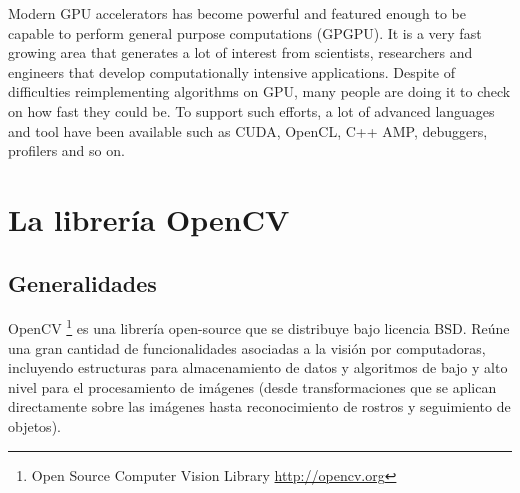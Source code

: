 \documentclass[a4paper,10pt]{report}
\begin{document}




Modern GPU accelerators has become powerful and featured enough to be capable to perform general purpose computations (GPGPU).  
It is a very fast growing area that generates a lot of interest from scientists, researchers and engineers that develop computationally intensive applications. 
Despite of difficulties reimplementing algorithms on GPU, many people are doing it to check on how fast they could be. 
To support such efforts, a lot of advanced languages and tool have been available such as CUDA, OpenCL, C++ AMP, debuggers, profilers and so on.


% 
% 












\chapter{La librería OpenCV}

\section{Generalidades}
OpenCV \footnote{Open Source Computer Vision Library \url{http://opencv.org}} es una librería open-source que se distribuye bajo licencia BSD. 
Reúne una gran cantidad de funcionalidades asociadas a la visión por computadoras, incluyendo estructuras para almacenamiento de datos y algoritmos de bajo y alto
nivel para el procesamiento de imágenes (desde transformaciones que se aplican directamente sobre las imágenes hasta reconocimiento de rostros y seguimiento de objetos).
\end{document}
